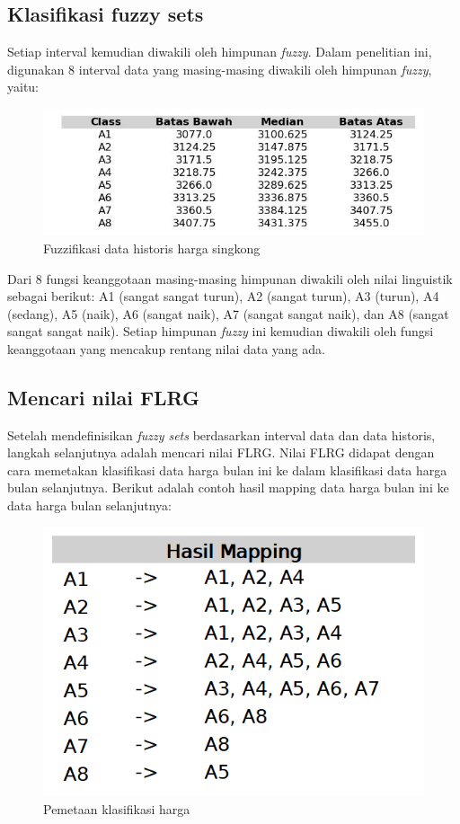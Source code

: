 \documentclass[conference]{IEEEtran}
\begin{document}
\subsection{Klasifikasi fuzzy sets}
Setiap interval kemudian diwakili oleh himpunan \textit{fuzzy}. Dalam penelitian ini, digunakan 8 interval data yang masing-masing diwakili oleh himpunan \textit{fuzzy}, yaitu:
\begin{figure}[H]
    \centering
    \includegraphics[width=\columnwidth]{images/table.jpg} 
    \caption{Fuzzifikasi data historis harga singkong}
\end{figure}
Dari 8 fungsi keanggotaan masing-masing himpunan diwakili oleh nilai linguistik sebagai berikut: A1 (sangat sangat turun), A2 (sangat turun), A3 (turun), A4 (sedang), A5 (naik), A6 (sangat naik), A7 (sangat sangat naik), dan A8 (sangat sangat sangat naik). Setiap himpunan \textit{fuzzy} ini kemudian diwakili oleh fungsi keanggotaan yang mencakup rentang nilai data yang ada. 

\subsection{Mencari nilai FLRG}
Setelah mendefinisikan \textit{fuzzy sets} berdasarkan interval data dan data historis, langkah selanjutnya adalah mencari nilai FLRG. Nilai FLRG didapat dengan cara memetakan klasifikasi data harga bulan ini ke dalam klasifikasi data harga bulan selanjutnya. Berikut adalah contoh hasil mapping data harga bulan ini ke data harga bulan selanjutnya:

\begin{figure}[H]
    \centering
    \includegraphics[scale=0.4]{images/hasil_mapping.png} 
    \caption{Pemetaan klasifikasi harga}
\end{figure}
\end{document}
